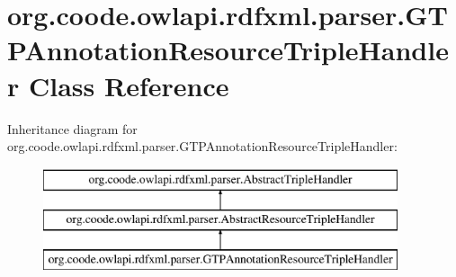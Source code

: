 \hypertarget{classorg_1_1coode_1_1owlapi_1_1rdfxml_1_1parser_1_1_g_t_p_annotation_resource_triple_handler}{\section{org.\-coode.\-owlapi.\-rdfxml.\-parser.\-G\-T\-P\-Annotation\-Resource\-Triple\-Handler Class Reference}
\label{classorg_1_1coode_1_1owlapi_1_1rdfxml_1_1parser_1_1_g_t_p_annotation_resource_triple_handler}
}
Inheritance diagram for org.\-coode.\-owlapi.\-rdfxml.\-parser.\-G\-T\-P\-Annotation\-Resource\-Triple\-Handler\-:\begin{figure}[H]
\begin{center}
\leavevmode
\includegraphics[height=3.000000cm]{classorg_1_1coode_1_1owlapi_1_1rdfxml_1_1parser_1_1_g_t_p_annotation_resource_triple_handler}
\end{center}
\end{figure}
